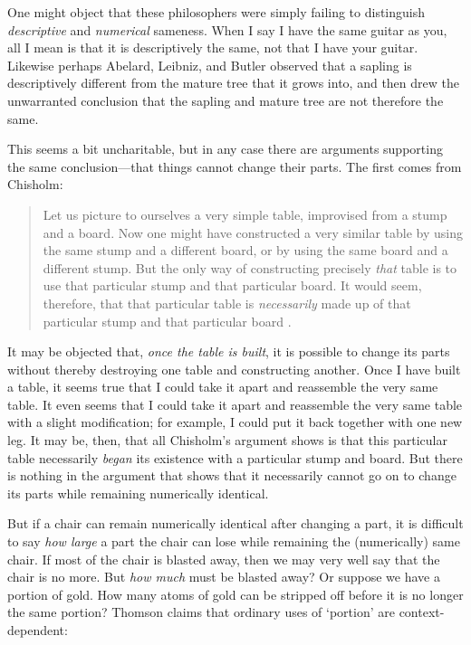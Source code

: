 \documentclass[12pt,twoside]{reedfancy}
\begin{document}
\begin{spacing}{1.25}
One might object that these philosophers were simply failing to
distinguish {\em descriptive} and {\em numerical} sameness.  When I
say I have the same guitar as you, all I mean is that it is
descriptively the same, not that I have your guitar.  Likewise perhaps
Abelard, Leibniz, and Butler observed that a sapling is descriptively
different from the mature tree that it grows into, and then drew the
unwarranted conclusion that the sapling and mature tree are not
therefore the same.

This seems a bit uncharitable, but in any case there are arguments
supporting the same conclusion---that things cannot change their
parts.  The first comes from Chisholm:

\begin{quote}
Let us picture to ourselves a very simple table, improvised from a
stump and a board.  Now one might have constructed a very similar
table by using the same stump and a different board, or by using the
same board and a different stump.  But the only way of constructing
precisely {\em that} table is to use that particular stump and that
particular board.  It would seem, therefore, that that particular
table is {\em necessarily} made up of that particular stump and that
particular board \citeyearpar[146]{chisholm1979}.
\end{quote}

It may be objected that, {\em once the table is built}, it is possible
to change its parts without thereby destroying one table and
constructing another.  Once I have built a table, it seems true that I
could take it apart and reassemble the very same table.  It even seems
that I could take it apart and reassemble the very same table with a
slight modification; for example, I could put it back together with
one new leg.  It may be, then, that all Chisholm's argument shows is
that this particular table necessarily {\em began} its existence with
a particular stump and board.  But there is nothing in the argument
that shows that it necessarily cannot go on to change its parts while
remaining numerically identical.

But if a chair can remain numerically identical after changing a part,
it is difficult to say {\em how large} a part the chair can lose while
remaining the (numerically) same chair.  If most of the chair is
blasted away, then we may very well say that the chair is no more.
But {\em how much} must be blasted away?  Or suppose we have a portion
of gold.  How many atoms of gold can be stripped off before it is no
longer the same portion?  Thomson claims that ordinary uses of
`portion' are context-dependent:


\end{spacing}
\end{document}
